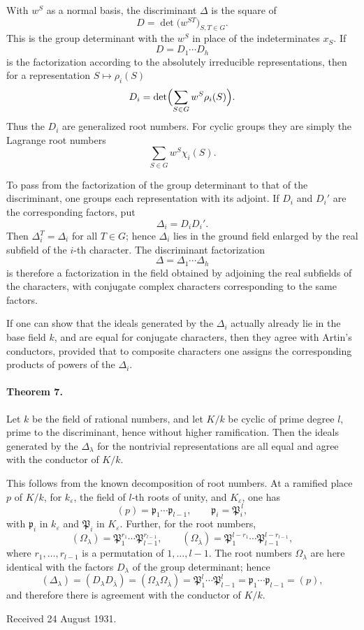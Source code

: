 \documentclass[11pt]{article}
\begin{document}
With \(w^S\) as a normal basis, the discriminant \(\Delta\) is the square of
\[
        D=\det\bigl(w^{ST}\bigr)_{S,T\in G}.
\]
This is the group determinant with the \(w^S\) in place of the indeterminates \(x_S\). If
\[
        D=D_1\cdots D_h
\]
is the factorization according to the absolutely irreducible representations, then for a representation \(S\mapsto \rho_i(S)\)
\[
        D_i=\det\Bigl(\sum_{S\in G} w^S\rho_i(S)\Bigr).
\]
Thus the \(D_i\) are generalized root numbers. For cyclic groups they are simply the Lagrange root numbers
\[
        \sum_{S\in G} w^S\chi_i(S).
\]

To pass from the factorization of the group determinant to that of the discriminant, one groups each representation with its adjoint. If \(D_i\) and \(D_i'\) are the corresponding factors, put
\[
        \Delta_i=D_iD_i'.
\]
Then \(\Delta_i^T=\Delta_i\) for all \(T\in G\); hence \(\Delta_i\) lies in the ground field enlarged by the real subfield of the \(i\)-th character. The discriminant factorization
\[
        \Delta=\Delta_1\cdots\Delta_h
\]
is therefore a factorization in the field obtained by adjoining the real subfields of the characters, with conjugate complex characters corresponding to the same factors.

If one can show that the ideals generated by the \(\Delta_i\) actually already lie in the base field \(k\), and are equal for conjugate characters, then they agree with Artin's conductors, provided that to composite characters one assigns the corresponding products of powers of the \(\Delta_i\).

\paragraph{Theorem 7.}
Let \(k\) be the field of rational numbers, and let \(K/k\) be cyclic of prime degree \(l\), prime to the discriminant, hence without higher ramification. Then the ideals generated by the \(\Delta_\lambda\) for the nontrivial representations are all equal and agree with the conductor of \(K/k\).

This follows from the known decomposition of root numbers. At a ramified place \(p\) of \(K/k\), for \(k_\varepsilon\), the field of \(l\)-th roots of unity, and \(K_\varepsilon\), one has
\[
        (p)=\mathfrak p_1\cdots\mathfrak p_{l-1},\qquad
        \mathfrak p_i=\mathfrak P_i^{\,l},
\]
with \(\mathfrak p_i\) in \(k_\varepsilon\) and \(\mathfrak P_i\) in \(K_\varepsilon\). Further, for the root numbers,
\[
        (\Omega_\lambda)=\mathfrak P_1^{r_1}\cdots
        \mathfrak P_{l-1}^{r_{l-1}},
        \qquad
        (\Omega_{\bar\lambda})=
        \mathfrak P_1^{l-r_1}\cdots \mathfrak P_{l-1}^{l-r_{l-1}},
\]
where \(r_1,\ldots,r_{l-1}\) is a permutation of \(1,\ldots,l-1\). The root numbers \(\Omega_\lambda\) are here identical with the factors \(D_\lambda\) of the group determinant; hence
\[
        (\Delta_\lambda)=(D_\lambda D_{\bar\lambda})
        =(\Omega_\lambda\Omega_{\bar\lambda})
        =\mathfrak P_1^l\cdots\mathfrak P_{l-1}^l
        =\mathfrak p_1\cdots\mathfrak p_{l-1}
        =(p),
\]
and therefore there is agreement with the conductor of \(K/k\).

\begin{center}
Received 24 August 1931.
\end{center}
\end{document}

